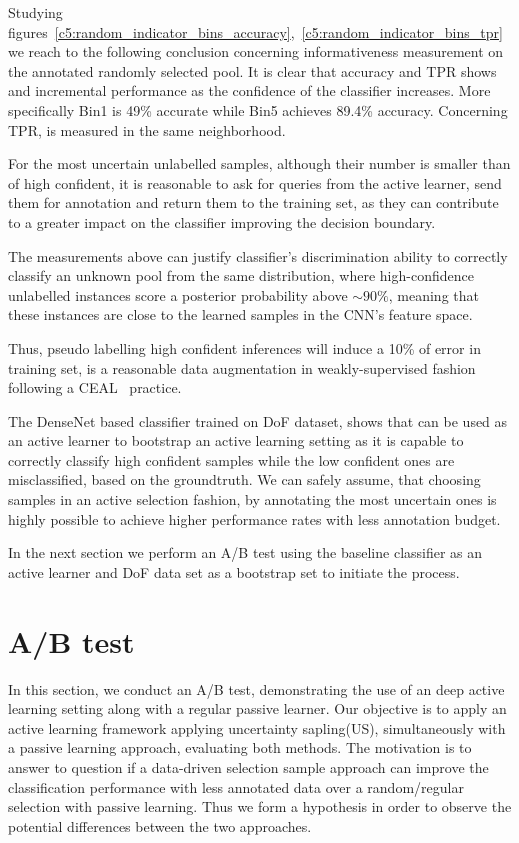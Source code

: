 Studying figures~\ref{c5:random_indicator_bins_accuracy},~\ref{c5:random_indicator_bins_tpr} we reach to the following conclusion concerning informativeness measurement on the annotated randomly selected pool. It is clear that accuracy and TPR shows and incremental performance as the confidence of the classifier increases.
More specifically Bin1 is 49\% accurate while Bin5 achieves 89.4\% accuracy. Concerning TPR, is measured in the same neighborhood.

For the most uncertain unlabelled samples, although their number is smaller than of high confident, it is reasonable to ask for queries from the active learner, send them for annotation and return them to the training set, as they can contribute to a greater impact on the classifier improving the decision boundary.

The measurements above can justify classifier's discrimination ability to correctly classify an unknown pool from the same distribution, where high-confidence unlabelled instances score a posterior probability above $\sim 90\%$, meaning that these instances are close to the learned samples in the CNN's feature space.

Thus, pseudo labelling high confident inferences will induce a 10\% of error in training set, is a reasonable data augmentation in weakly-supervised fashion following a CEAL~\cite{wang2016cost} practice.

The DenseNet based classifier trained on DoF dataset, shows that can be used as an active learner to bootstrap an active learning setting as it is capable to correctly classify high confident samples while the low confident ones are misclassified, based on the groundtruth.
We can safely assume, that choosing samples in an active selection fashion, by annotating the most uncertain ones is highly possible to achieve higher performance rates with less annotation budget.

In the next section we perform an A/B test using the baseline classifier as an active learner and DoF data set as a bootstrap set to initiate the process.

\newpage
\section{A/B test}
\label{c5:section_ab_test}

In this section, we conduct an A/B test, demonstrating the use of an deep active learning setting along with a regular passive learner.
Our objective is to apply an active learning framework applying uncertainty sapling(US), simultaneously with a passive learning approach, evaluating both methods. The motivation is to answer to question if a data-driven selection sample approach can improve the classification performance with less annotated data over a random/regular selection with passive learning.
Thus we form a hypothesis in order to observe the potential differences between the two approaches.

